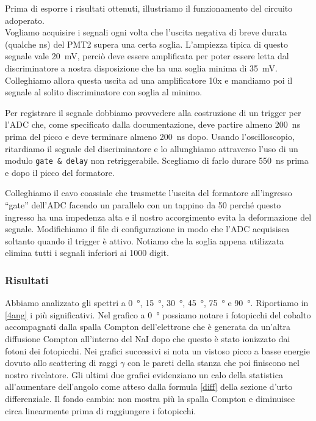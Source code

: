 Prima di esporre i risultati ottenuti, illustriamo il funzionamento del circuito adoperato.\\
Vogliamo acquisire i segnali ogni volta che l'uscita negativa di breve durata (qualche \si{ns}) del PMT2 supera una certa soglia. L'ampiezza tipica di questo segnale vale \SI{20}{mV}, perciò deve essere amplificata per poter essere letta dal discriminatore a nostra disposizione che ha una soglia minima di \SI{35}{mV}. Colleghiamo allora questa uscita ad una amplificatore 10x 
e mandiamo poi il segnale al solito discriminatore con soglia al minimo.

Per registrare il segnale dobbiamo provvedere alla costruzione di un trigger per l'ADC che, come specificato dalla documentazione, deve partire almeno \SI{200}{ns} prima del picco e deve terminare almeno \SI{200}{ns} dopo. Usando l'oscilloscopio, ritardiamo il segnale del discriminatore e lo allunghiamo attraverso l'uso di un modulo \texttt{gate \& delay} non retriggerabile. Scegliamo di farlo durare \SI{550}{ns} prima e dopo il picco del formatore.

Colleghiamo il cavo coassiale che trasmette l'uscita del formatore all'ingresso ``gate'' dell'ADC facendo un parallelo con un tappino da \SI{50}{\Omega} perché questo ingresso ha una impedenza alta e il nostro accorgimento evita la deformazione del segnale.
Modifichiamo il file di configurazione in modo che l'ADC acquisisca soltanto quando il trigger è attivo. Notiamo che la soglia appena utilizzata elimina tutti i segnali inferiori ai 1000 digit. 

\subsubsection{Risultati} %

Abbiamo analizzato gli spettri a \SI{0}{\degree}, \SI{15}{\degree}, \SI{30}{\degree}, \SI{45}{\degree}, \SI{75}{\degree} e \SI{90}{\degree}. Riportiamo in \autoref{4ang} i più significativi.
Nel grafico a \SI{0}{\degree} possiamo notare i fotopicchi del cobalto accompagnati dalla spalla Compton  dell'elettrone che è generata da un'altra diffusione Compton all'interno del NaI dopo che questo è stato ionizzato dai fotoni dei fotopicchi.
Nei grafici successivi si nota un vistoso picco a basse energie dovuto allo scattering di raggi $\gamma$ con le pareti della stanza che poi finiscono nel nostro rivelatore.
Gli ultimi due grafici evidenziano un calo della statistica all'aumentare dell'angolo come atteso dalla formula \autoref{diff} della sezione d'urto differenziale. Il fondo cambia: non mostra più la spalla Compton e diminuisce circa linearmente prima di raggiungere i fotopicchi.

